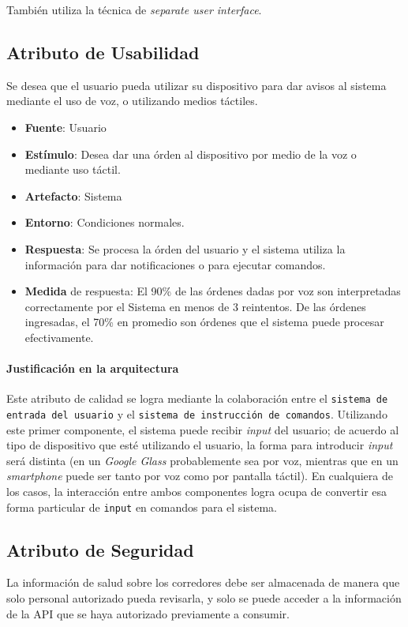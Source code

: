 También utiliza la técnica de \textit{separate user interface}.


\subsection{Atributo de Usabilidad}
Se desea que el usuario pueda utilizar su dispositivo para dar avisos al sistema mediante el uso de voz, o utilizando medios táctiles.

\begin{itemize}
  \item \textbf{Fuente}: Usuario
  \item \textbf{Estímulo}: Desea dar una órden al dispositivo por medio de la voz o mediante uso táctil.
  \item \textbf{Artefacto}: Sistema
  \item \textbf{Entorno}: Condiciones normales.
  \item \textbf{Respuesta}: Se procesa la órden del usuario y el sistema utiliza la información para dar notificaciones o para ejecutar comandos.
  \item \textbf{Medida} de respuesta: El 90\% de las órdenes dadas por voz son interpretadas correctamente por el Sistema en menos de 3 reintentos. De las órdenes ingresadas, el 70\% en promedio son órdenes que el sistema puede procesar efectivamente.
\end{itemize}

\paragraph{Justificación en la arquitectura} %
Este atributo de calidad se logra mediante la colaboración entre el \texttt{sistema de entrada del usuario} y el \texttt{sistema de instrucción de comandos}. Utilizando este primer componente, el sistema puede recibir \textit{input} del usuario; de acuerdo al tipo de dispositivo que esté utilizando el usuario, la forma para introducir \textit{input} será distinta (en un \emph{Google Glass} probablemente sea por voz, mientras que en un \emph{smartphone} puede ser tanto por voz como por pantalla táctil). En cualquiera de los casos, la interacción entre ambos componentes logra ocupa de convertir esa forma particular de \texttt{input} en comandos para el sistema.


\subsection{Atributo de Seguridad}
La información de salud sobre los corredores debe ser almacenada de manera que solo personal autorizado pueda revisarla, y solo se puede acceder a la información de la API que se haya autorizado previamente a consumir.

